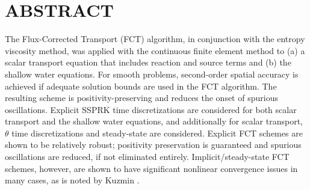\chapter*{ABSTRACT}

\pagestyle{plain} %
\setcounter{page}{2}

\indent
The Flux-Corrected Transport (FCT) algorithm, in conjunction with the
entropy viscosity method, was applied with the continuous finite element method
to (a) a scalar transport equation that includes reaction and source terms and
(b) the shallow water equations.
For smooth problems, second-order spatial accuracy is achieved if adequate
solution bounds are used in the FCT algorithm. The resulting scheme is
positivity-preserving and reduces the onset of spurious oscillations.
Explicit SSPRK time discretizations are considered for both scalar
transport and the shallow water equations, and additionally
for scalar transport, $\theta$ time discretizations and
steady-state are considered. Explicit FCT schemes are shown to
be relatively robust; positivity preservation is guaranteed and spurious
oscillations are reduced, if not eliminated entirely.
Implicit/steady-state FCT schemes, however, are shown to have
significant nonlinear convergence issues in many cases, as is noted by
Kuzmin \cite{kuzmin_FCT}.

\pagebreak{}
